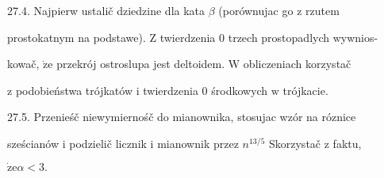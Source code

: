 \documentclass[a4paper,12pt]{article}
\begin{document}
27.4. Najpierw ustalič dziedzine dla kata $\beta$ (porównujac go $\mathrm{z}$ rzutem

prostokatnym na podstawe). $\mathrm{Z}$ twierdzenia $0$ trzech prostopadlych wywnios-

kowač, $\dot{\mathrm{z}}\mathrm{e}$ przekrój ostroslupa jest deltoidem. $\mathrm{W}$ obliczeniach korzystač

$\mathrm{z}$ podobieństwa trójkatów $\mathrm{i}$ twierdzenia $0$ środkowych $\mathrm{w}$ trójkacie.

27.5. Przenieśč niewymiernośč do mianownika, stosujac wzór na róznice

sześcianów $\mathrm{i}$ podzielič licznik $\mathrm{i}$ mianownik przez $n^{13/5}$ Skorzystač $\mathrm{z}$ faktu,

$\dot{\mathrm{z}}\mathrm{e}\alpha<3.$
\end{document}
